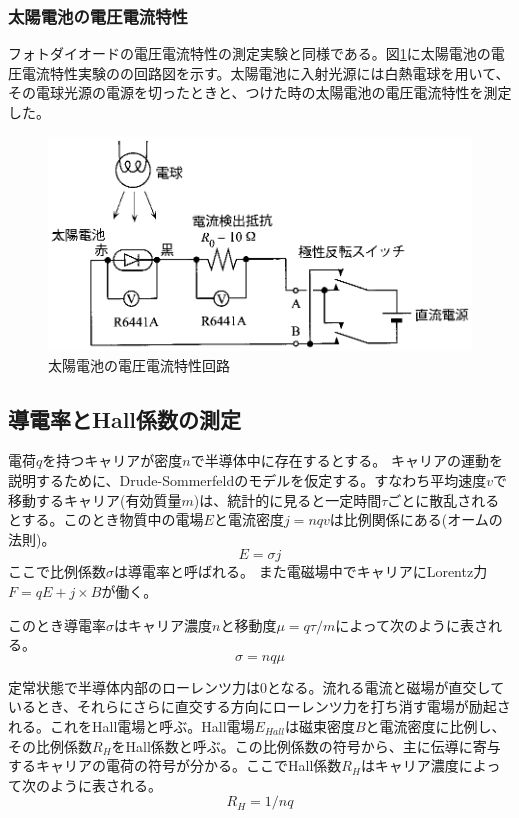 \documentclass[11pt,a4]{jarticle}
\begin{document}
\subsubsection{太陽電池の電圧電流特性}
フォトダイオードの電圧電流特性の測定実験と同様である。図\ref{fig:solor_cell_setup}に太陽電池の電圧電流特性実験のの回路図を示す。太陽電池に入射光源には白熱電球を用いて、その電球光源の電源を切ったときと、つけた時の太陽電池の電圧電流特性を測定した。
\begin{figure}[!htbp]
   \begin{center}
    \includegraphics[width=0.7\hsize]{./solor_cell_setup.eps}
    \caption{太陽電池の電圧電流特性回路}
     \label{fig:solor_cell_setup}
   \end{center}
\end{figure}

\subsection{導電率とHall係数の測定}
電荷$q$を持つキャリアが密度$n$で半導体中に存在するとする。
キャリアの運動を説明するために、Drude-Sommerfeldのモデルを仮定する。すなわち平均速度$v$で移動するキャリア(有効質量$m$)は、統計的に見ると一定時間$\tau$ごとに散乱されるとする。このとき物質中の電場$E$と電流密度$j=nqv$は比例関係にある(オームの法則)。
\begin{equation} 
E = \sigma j
\label{eq:conductivity}
\end{equation}
ここで比例係数$\sigma$は導電率と呼ばれる。
また電磁場中でキャリアにLorentz力$F = qE + j \times B$が働く。

このとき導電率$\sigma$はキャリア濃度$n$と移動度$\mu=q\tau/m$によって次のように表される。
\begin{equation}
\sigma = n q \mu
\label{eq:sigma}
\end{equation}

定常状態で半導体内部のローレンツ力は0となる。流れる電流と磁場が直交しているとき、それらにさらに直交する方向にローレンツ力を打ち消す電場が励起される。これをHall電場と呼ぶ。Hall電場$E_{Hall}$は磁束密度$B$と電流密度に比例し、その比例係数$R_H$をHall係数と呼ぶ。この比例係数の符号から、主に伝導に寄与するキャリアの電荷の符号が分かる。ここでHall係数$R_H$はキャリア濃度によって次のように表される。
\begin{equation}
R_H = 1/ n q 
\label{eq:R_H}
\end{equation}
\end{document}
